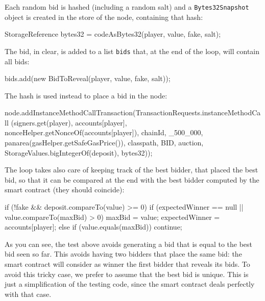Each random bid is hashed (including a random salt) and a \texttt{Bytes32Snapshot} object
is created in the store of the node, containing that hash:
%
\begin{codebox}\begin{javalst}
StorageReference bytes32 = codeAsBytes32(player, value, fake, salt);
\end{javalst}\end{codebox}
%
The bid, in clear, is added to a list \texttt{bids} that, at the end of the loop,
will contain all bids:
%
\begin{codebox}\begin{javalst}
bids.add(new BidToReveal(player, value, fake, salt));
\end{javalst}\end{codebox}
%
The hash is used instead to place a bid in the node:
%
\begin{codebox}\begin{javalst}
node.addInstanceMethodCallTransaction(TransactionRequests.instanceMethodCall
  (signers.get(player), accounts[player],
  nonceHelper.getNonceOf(accounts[player]), chainId,
  _500_000, panarea(gasHelper.getSafeGasPrice()), classpath, BID,
  auction, StorageValues.bigIntegerOf(deposit), bytes32));
\end{javalst}\end{codebox}
%
The loop takes also care of keeping track of the best bidder, that placed
the best bid, so that it can be compared at the end with the best bidder
computed by the smart contract (they should coincide):
%
\begin{codebox}\begin{javalst}
if (!fake && deposit.compareTo(value) >= 0)
  if (expectedWinner == null || value.compareTo(maxBid) > 0) {
    maxBid = value;
    expectedWinner = accounts[player];
  }
  else if (value.equals(maxBid))
    continue;
\end{javalst}\end{codebox}
%
As you can see, the test above avoids generating a bid that
is equal to the best bid seen so far. This avoids having two bidders
that place the same bid: the smart contract will consider as winner
the first bidder that reveals its bids. To avoid this tricky case, we prefer
to assume that the best bid is unique. This is just a simplification of the
testing code, since the smart contract deals perfectly with that case.

